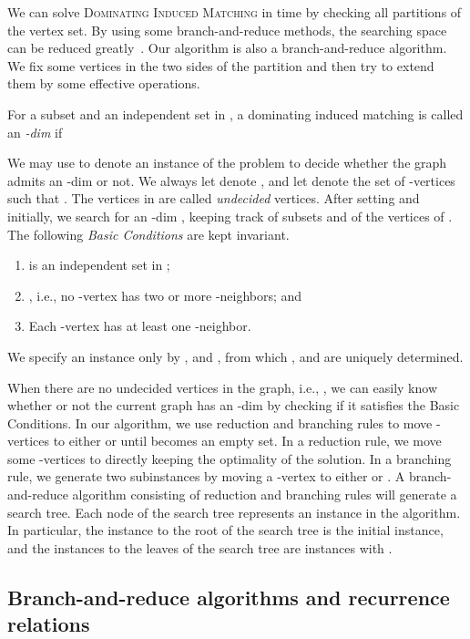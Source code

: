\documentclass{elsart_TR2}
\begin{document}
We can solve  \textsc{Dominating Induced Matching} in  time by checking all partitions of the vertex set.
By using some branch-and-reduce methods, the searching space can be reduced greatly~\cite{LMS:DIMexact}.
Our algorithm is also a branch-and-reduce algorithm. We fix some vertices in the two sides of the partition and then try to extend them by some effective operations.

\medskip
For a subset  and an independent set
 in ,
a dominating induced matching  is called an {\em -dim}
if

We may use  to denote an instance of the problem to decide whether the graph  admits an -dim or not.
We always let  denote ,
and let  denote the set of -vertices  such that .
The vertices in  are called {\em undecided\/} vertices.
After setting  and  initially,
we search for an -dim ,
 keeping track of subsets  and  of the vertices of .
The following \emph{Basic Conditions} are kept invariant.
\begin{enumerate}
\item
 is an independent set in ;
\item
, i.e., no -vertex has two or more -neighbors; and
\item
Each -vertex has  at least one -neighbor.
\end{enumerate}
We specify an instance only by ,  and , from which
,  and  are uniquely determined.



When there are no undecided vertices in the graph, i.e., ,
we can easily know whether or not the  current graph has an -dim  by checking if it satisfies the Basic Conditions.
In our algorithm, we use reduction and branching rules to move
-vertices to either  or  until  becomes an empty set. In a reduction rule, we move some -vertices  to  directly keeping the optimality of the solution.
In a branching rule, we generate two subinstances by moving a -vertex to either  or . A branch-and-reduce algorithm consisting of reduction and branching rules will generate a search tree.
Each node of the search tree represents an instance in the algorithm.
In particular, the instance to the root of the search tree is the initial instance, and
 the instances to the leaves of the search tree are instances with .

\subsection{Branch-and-reduce algorithms and recurrence relations}
\end{document}
